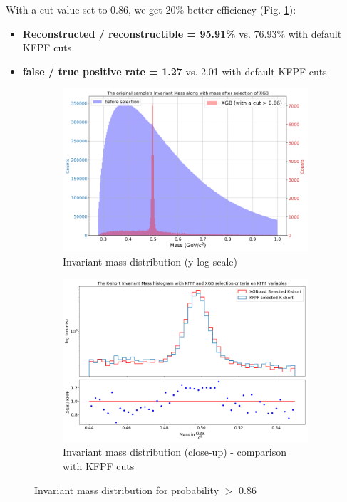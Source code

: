 With a cut value set to 0.86, we get $20\%$ better efficiency (Fig. \ref{effic}):
\begin{itemize}
    \item \textbf{Reconstructed \PKshort / reconstructible \PKshort = 95.91\%}  vs. 76.93\% with default KFPF cuts
    \item \textbf{false / true positive rate = 1.27} vs. 2.01 with default KFPF cuts
\end{itemize}
\begin{figure}
 \centering
    \begin{subfigure}[b]{0.99\linewidth} 
        \centering
        \includegraphics[width=\textwidth]{img/better_efficiency1.png} 
        \caption{Invariant mass distribution (y log scale)} 
        \vspace{0.3cm}
    \end{subfigure}
     \hfill
       \begin{subfigure}[b]{0.99\linewidth}
        \centering
        \includegraphics[width=\textwidth]{img/better_efficiency2.png} 
        \caption{Invariant mass distribution (close-up) - comparison with KFPF cuts}
        \vspace{0.3cm}
    \end{subfigure}
    \caption{Invariant mass distribution for probability $>$ 0.86}\label{effic}
\end{figure}

